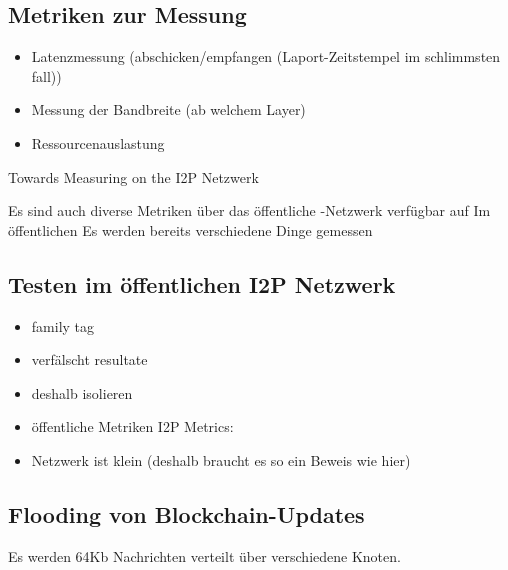 \subsection{Metriken zur Messung}

\begin{itemize}
    \item Latenzmessung (abschicken/empfangen (Laport-Zeitstempel im schlimmsten fall))
    \item Messung der Bandbreite (ab welchem Layer)
    \item Ressourcenauslastung
\end{itemize}

Towards Measuring on the I2P Netzwerk
\cite{wang_towards_2013}


Es sind auch diverse Metriken über das öffentliche -Netzwerk verfügbar auf
Im öffentlichen  Es werden bereits verschiedene Dinge gemessen


\cite{timpanaro_monitoring_nodate}

\subsection{Testen im öffentlichen I2P Netzwerk}

\begin{itemize}
    \item family tag \cite{noauthor_family_nodate}
    \item verfälscht resultate
    \item deshalb isolieren
    \item öffentliche Metriken  I2P Metrics: \cite{noauthor_i2p_nodate-4}
    \item Netzwerk ist klein (deshalb braucht es so ein Beweis wie hier)
\end{itemize}

\subsection{Flooding von Blockchain-Updates}

Es werden 64Kb Nachrichten verteilt über verschiedene Knoten.

